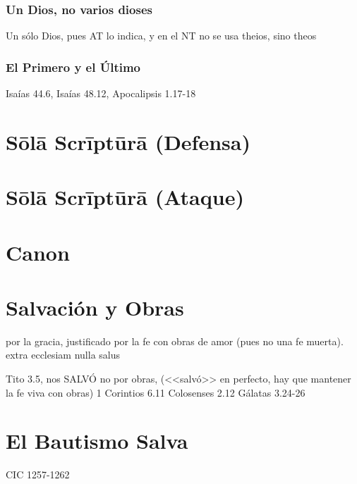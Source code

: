 \documentclass[12pt]{report}
\begin{document}
	
	\subsubsection{Un Dios, no varios dioses}
	Un sólo Dios, pues AT lo indica, y en el NT no se usa theios, sino theos


	\subsubsection{El Primero y el Último}
	Isaías 44.6, Isaías 48.12, Apocalipsis 1.17-18
	
	
	
	
	
	\section{Sōlā Scrīptūrā (Defensa)}
	
	
	\section{Sōlā Scrīptūrā (Ataque)}
	
	\section{Canon}
	
	\section{Salvación y Obras}
	
	por la gracia, justificado por la fe con obras de amor (pues no una fe muerta). extra ecclesiam nulla salus
	
	Tito 3.5, nos SALVÓ no por obras, (<<salvó>> en perfecto, hay que mantener la fe viva con obras)
	1 Corintios 6.11
	Colosenses 2.12
	Gálatas 3.24-26
	
	\section{El Bautismo Salva}
	
	CIC 1257-1262
	
\end{document}
